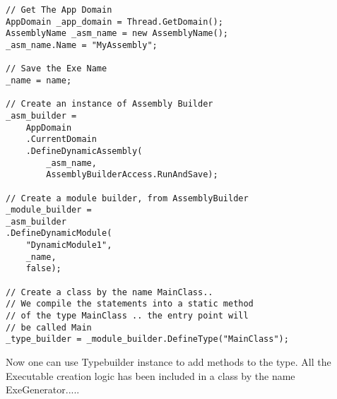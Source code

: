 \lstset{style=csharp}
\begin{lstlisting}
// Get The App Domain
AppDomain _app_domain = Thread.GetDomain();
AssemblyName _asm_name = new AssemblyName();
_asm_name.Name = "MyAssembly";

// Save the Exe Name
_name = name;

// Create an instance of Assembly Builder
_asm_builder = 
	AppDomain
	.CurrentDomain
	.DefineDynamicAssembly(
		_asm_name,
		AssemblyBuilderAccess.RunAndSave);

// Create a module builder, from AssemblyBuilder
_module_builder = 
_asm_builder
.DefineDynamicModule(
	"DynamicModule1", 
	_name, 
	false);

// Create a class by the name MainClass..
// We compile the statements into a static method
// of the type MainClass .. the entry point will
// be called Main
_type_builder = _module_builder.DefineType("MainClass");
\end{lstlisting}
Now one can use Typebuilder instance to add methods to the type.
All the Executable creation logic has been included in a class by the name ExeGenerator.....
\lstset{style=csharp}
